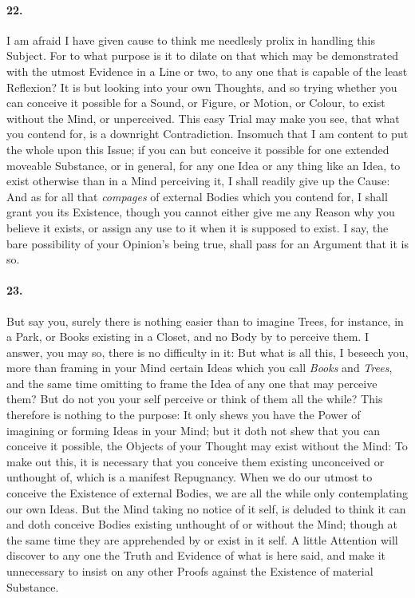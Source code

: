 \documentclass[]{article}
\newenvironment{sectionbody}{}{}
\begin{document}
\begin{sectionbody}
\paragraph{22.} I am afraid I have given cause to think me needlesly prolix in
handling this Subject.  For to what purpose is it to dilate on
that which may be demonstrated with the utmost Evidence in a Line
or two, to any one that is capable of the least Reflexion? It is
but looking into your own Thoughts, and so trying whether you can
conceive it possible for a Sound, or Figure, or Motion, or
Colour, to exist without the Mind, or unperceived.  This easy
Trial may make you see, that what you contend for, is a downright
Contradiction.  Insomuch that I am content to put the whole upon
this Issue; if you can but conceive it possible for one extended
moveable Substance, or in general, for any one Idea or any thing
like an Idea, to exist otherwise than in a Mind perceiving it, I
shall readily give up the Cause: And as for all that
\emph{compages} of external Bodies which you contend for, I
shall grant you its Existence, though you cannot either give me
any Reason why you believe it exists, or assign any use to it
when it is supposed to exist.  I say, the bare possibility of
your Opinion's being true, shall pass for an Argument that it is
so.



\paragraph{23.} But say you, surely there is nothing easier than to imagine
Trees, for instance, in a Park, or Books existing in a Closet,
and no Body by to perceive them.  I answer, you may so, there is
no difficulty in it: But what is all this, I beseech you, more
than framing in your Mind certain Ideas which you call
\emph{Books} and \emph{Trees}, and the same time omitting to
frame the Idea of any one that may perceive them? But do not you
your self perceive or think of them all the while?  This
therefore is nothing to the purpose: It only shews you have the
Power of imagining or forming Ideas in your Mind; but it doth not
shew that you can conceive it possible, the Objects of your
Thought may exist without the Mind: To make out this, it is
necessary that you conceive them existing unconceived or
unthought of, which is a manifest Repugnancy.  When we do our
utmost to conceive the Existence of external Bodies, we are all
the while only contemplating our own Ideas.  But the Mind taking
no notice of it self, is deluded to think it can and doth
conceive Bodies existing unthought of or without the Mind; though
at the same time they are apprehended by or exist in it self.  A
little Attention will discover to any one the Truth and Evidence
of what is here said, and make it unnecessary to insist on any
other Proofs against the Existence of material Substance.




\end{sectionbody}
\end{document}
